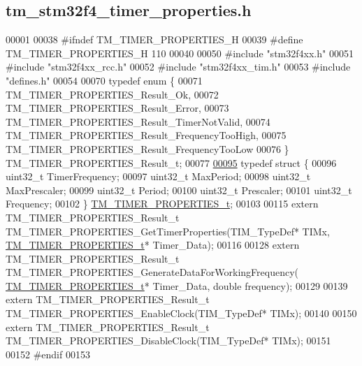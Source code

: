 \hypertarget{tm__stm32f4__timer__properties_8h_source}{}\subsection{tm\+\_\+stm32f4\+\_\+timer\+\_\+properties.\+h}

\begin{DoxyCode}
00001 
00038 \textcolor{preprocessor}{#ifndef TM\_TIMER\_PROPERTIES\_H}
00039 \textcolor{preprocessor}{#define TM\_TIMER\_PROPERTIES\_H 110}
00040 
00050 \textcolor{preprocessor}{#include "stm32f4xx.h"}
00051 \textcolor{preprocessor}{#include "stm32f4xx\_rcc.h"}
00052 \textcolor{preprocessor}{#include "stm32f4xx\_tim.h"}
00053 \textcolor{preprocessor}{#include "defines.h"}
00054 
00070 \textcolor{keyword}{typedef} \textcolor{keyword}{enum} \{
00071     TM\_TIMER\_PROPERTIES\_Result\_Ok,
00072     TM\_TIMER\_PROPERTIES\_Result\_Error,
00073     TM\_TIMER\_PROPERTIES\_Result\_TimerNotValid,
00074     TM\_TIMER\_PROPERTIES\_Result\_FrequencyTooHigh,
00075     TM\_TIMER\_PROPERTIES\_Result\_FrequencyTooLow
00076 \} TM\_TIMER\_PROPERTIES\_Result\_t;
00077 
\hypertarget{tm__stm32f4__timer__properties_8h_source_l00095}{}\hyperlink{struct_t_m___t_i_m_e_r___p_r_o_p_e_r_t_i_e_s__t}{00095} \textcolor{keyword}{typedef} \textcolor{keyword}{struct }\{
00096     uint32\_t TimerFrequency;
00097     uint32\_t MaxPeriod;
00098     uint32\_t MaxPrescaler;
00099     uint32\_t Period;
00100     uint32\_t Prescaler;
00101     uint32\_t Frequency;
00102 \} \hyperlink{struct_t_m___t_i_m_e_r___p_r_o_p_e_r_t_i_e_s__t}{TM\_TIMER\_PROPERTIES\_t};
00103 
00115 \textcolor{keyword}{extern} TM\_TIMER\_PROPERTIES\_Result\_t TM\_TIMER\_PROPERTIES\_GetTimerProperties(TIM\_TypeDef* TIMx, 
      \hyperlink{struct_t_m___t_i_m_e_r___p_r_o_p_e_r_t_i_e_s__t}{TM\_TIMER\_PROPERTIES\_t}* Timer\_Data);
00116 
00128 \textcolor{keyword}{extern} TM\_TIMER\_PROPERTIES\_Result\_t TM\_TIMER\_PROPERTIES\_GenerateDataForWorkingFrequency(
      \hyperlink{struct_t_m___t_i_m_e_r___p_r_o_p_e_r_t_i_e_s__t}{TM\_TIMER\_PROPERTIES\_t}* Timer\_Data, \textcolor{keywordtype}{double} frequency);
00129 
00139 \textcolor{keyword}{extern} TM\_TIMER\_PROPERTIES\_Result\_t TM\_TIMER\_PROPERTIES\_EnableClock(TIM\_TypeDef* TIMx);
00140 
00150 \textcolor{keyword}{extern} TM\_TIMER\_PROPERTIES\_Result\_t TM\_TIMER\_PROPERTIES\_DisableClock(TIM\_TypeDef* TIMx);
00151  
00152 \textcolor{preprocessor}{#endif}
00153 
\end{DoxyCode}
